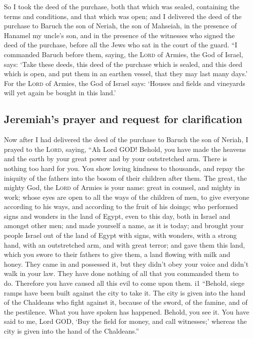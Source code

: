  So I took the deed of the purchase, both that which was
sealed, containing the terms and conditions, and that which was open;
 and I delivered the deed of the purchase to Baruch the
son of Neriah, the son of Mahseiah, in the presence of Hanamel my
uncle's son, and in the presence of the witnesses who signed the deed of
the purchase, before all the Jews who sat in the court of the guard.
 ``I commanded Baruch before them, saying,
 the \textsc{Lord} of Armies, the God of Israel, says:
`Take these deeds, this deed of the purchase which is sealed, and this
deed which is open, and put them in an earthen vessel, that they may
last many days.'  For the \textsc{Lord} of Armies, the
God of Israel says: `Houses and fields and vineyards will yet again be
bought in this land.'

\hypertarget{jeremiahs-prayer-and-request-for-clarification}{%
\subsection{Jeremiah's prayer and request for
clarification}\label{jeremiahs-prayer-and-request-for-clarification}}

 Now after I had delivered the deed of the purchase to
Baruch the son of Neriah, I prayed to the \textsc{Lord}, saying,
 ``Ah Lord GOD! Behold, you have made the heavens and the
earth by your great power and by your outstretched arm. There is nothing
too hard for you.  You show loving kindness to thousands,
and repay the iniquity of the fathers into the bosom of their children
after them. The great, the mighty God, the \textsc{Lord} of Armies is
your name:  great in counsel, and mighty in work; whose
eyes are open to all the ways of the children of men, to give everyone
according to his ways, and according to the fruit of his doings;
 who performed signs and wonders in the land of Egypt,
even to this day, both in Israel and amongst other men; and made
yourself a name, as it is today;  and brought your people
Israel out of the land of Egypt with signs, with wonders, with a strong
hand, with an outstretched arm, and with great terror; 
and gave them this land, which you swore to their fathers to give them,
a land flowing with milk and honey.  They came in and
possessed it, but they didn't obey your voice and didn't walk in your
law. They have done nothing of all that you commanded them to do.
Therefore you have caused all this evil to come upon them. i1
 ``Behold, siege ramps have been built against the city
to take it. The city is given into the hand of the Chaldeans who fight
against it, because of the sword, of the famine, and of the pestilence.
What you have spoken has happened. Behold, you see it. 
You have said to me, Lord GOD, `Buy the field for money, and call
witnesses;' whereas the city is given into the hand of the Chaldeans.''

